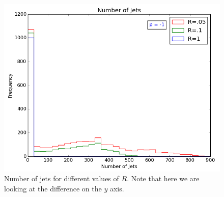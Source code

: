 \begin{figure}[hbtp]
 \centering
 \includegraphics[scale=.6]{images/n_of_jets_obs.png}
 \caption{Number of jets for different values of $R$. Note that here we are looking at the difference on the $y$ axis. 
 }\label{nofjet}
 \end{figure}
  
